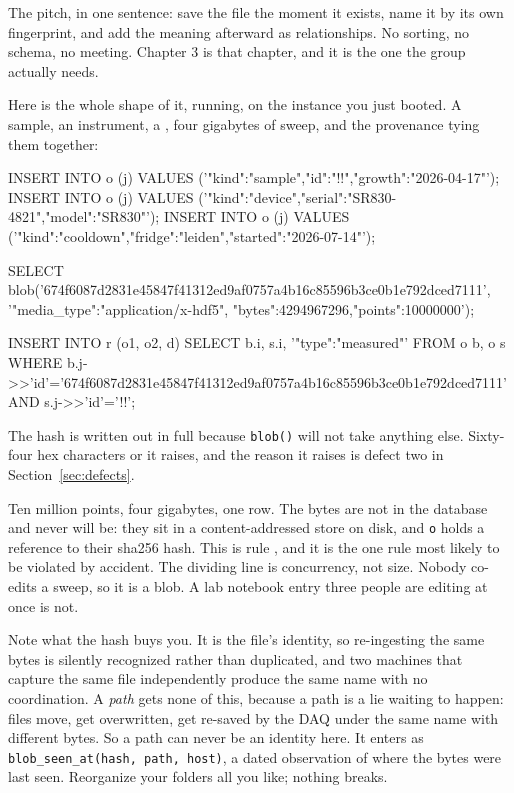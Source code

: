 The pitch, in one sentence: save the file the moment it exists, name it by its own fingerprint, and add the meaning afterward as relationships. No sorting, no schema, no meeting. Chapter 3 is that chapter, and it is the one the group actually needs.

Here is the whole shape of it, running, on the instance you just booted. A sample, an instrument, a \labRun{}, four gigabytes of sweep, and the provenance tying them together:

\begin{Check}
INSERT INTO o (j) VALUES ('{"kind":"sample","id":"!\labSample!","growth":"2026-04-17"}');
INSERT INTO o (j) VALUES ('{"kind":"device","serial":"SR830-4821","model":"SR830"}');
INSERT INTO o (j) VALUES ('{"kind":"cooldown","fridge":"leiden","started":"2026-07-14"}');

SELECT blob('674f6087d2831e45847f41312ed9af0757a4b16c85596b3ce0b1e792dced7111',
            '{"media_type":"application/x-hdf5",
              "bytes":4294967296,"points":10000000}');

INSERT INTO r (o1, o2, d)
  SELECT b.i, s.i, '{"type":"measured"}'
  FROM o b, o s
  WHERE b.j->>'id'='674f6087d2831e45847f41312ed9af0757a4b16c85596b3ce0b1e792dced7111'
    AND s.j->>'id'='!\labSample!';
\end{Check}

The hash is written out in full because \texttt{blob()} will not take anything else. Sixty-four hex characters or it raises, and the reason it raises is defect two in Section~\ref{sec:defects}.

Ten million points, four gigabytes, one row. The bytes are not in the database and never will be: they sit in a content-addressed store on disk, and \texttt{o} holds a reference to their sha256 hash. This is rule , and it is the one rule most likely to be violated by accident. The dividing line is concurrency, not size. Nobody co-edits a \labColdSystemShort{} sweep, so it is a blob. A lab notebook entry three people are editing at once is not.

Note what the hash buys you. It is the file's identity, so re-ingesting the same bytes is silently recognized rather than duplicated, and two machines that capture the same file independently produce the same name with no coordination. A \emph{path} gets none of this, because a path is a lie waiting to happen: files move, get overwritten, get re-saved by the DAQ under the same name with different bytes. So a path can never be an identity here. It enters as \texttt{blob\_seen\_at(hash, path, host)}, a dated observation of where the bytes were last seen. Reorganize your folders all you like; nothing breaks.

